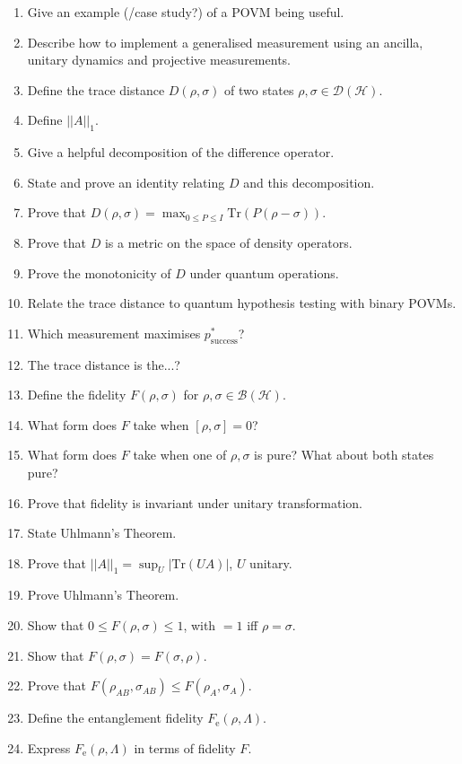 \documentclass{article}
\renewcommand{\rm}[1]{\mathrm{#1}}
\newcommand{\mc}[1]{\mathcal{#1}}
\begin{document}
\begin{enumerate}
    \item Give an example (/case study?) of a POVM being useful.
    \item Describe how to implement a generalised measurement using an ancilla, unitary dynamics and projective measurements.
    \item Define the trace distance $D(\rho,\sigma)$ of two states $\rho,\sigma\in \mc{D}(\mc{H})$.
    \item Define $||A||_1$.
    \item Give a helpful decomposition of the difference operator.
    \item State and prove an identity relating $D$ and this decomposition.
    \item Prove that $D(\rho,\sigma) = \max_{0\le P\le I}\textrm{Tr}(P(\rho-\sigma))$.
    \item Prove that $D$ is a metric on the space of density operators.
    \item Prove the monotonicity of $D$ under quantum operations.
    \item Relate the trace distance to quantum hypothesis testing with binary POVMs.
    \item Which measurement maximises $p^\ast_{\textrm{success}}$?
    \item The trace distance is the...?
    \item Define the fidelity $F(\rho,\sigma)$ for $\rho,\sigma \in \mc{B}(\mc{H})$.
    \item What form does $F$ take when $[\rho,\sigma] = 0$?
    \item What form does $F$ take when one of $\rho,\sigma$ is pure? What about both states pure?
    \item Prove that fidelity is invariant under unitary transformation.
    \item State Uhlmann's Theorem.
    \item Prove that $||A||_1 = \sup_{U}|\textrm{Tr}(UA)|$, $U$ unitary.
    \item Prove Uhlmann's Theorem.
    \item Show that $0\le F(\rho,\sigma) \le 1$, with $=1$ iff $\rho = \sigma$.
    \item Show that $F(\rho,\sigma) = F(\sigma,\rho)$.
    \item Prove that $F(\rho_{AB},\sigma_{AB})\le F(\rho_A,\sigma_A)$.
    \item Define the entanglement fidelity $F_\rm{e}(\rho,\Lambda)$.
    \item Express $F_\rm{e}(\rho,\Lambda)$ in terms of fidelity $F$.

\end{enumerate}
\end{document}
